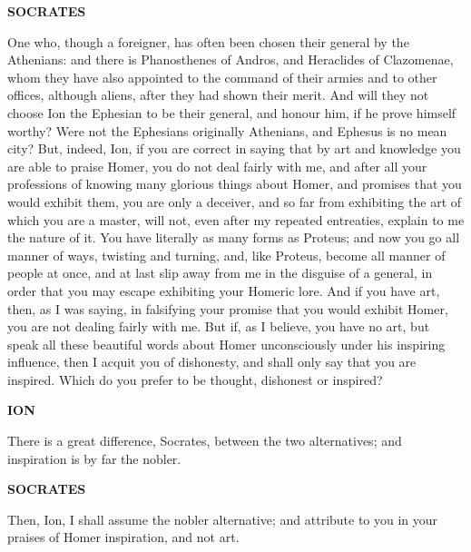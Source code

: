 \documentclass[11pt,letter]{article}
\begin{document}
\par \textbf{SOCRATES}
\par   One who, though a foreigner, has often been chosen their general by the Athenians:  and there is Phanosthenes of Andros, and Heraclides of Clazomenae, whom they have also appointed to the command of their armies and to other offices, although aliens, after they had shown their merit. And will they not choose Ion the Ephesian to be their general, and honour him, if he prove himself worthy? Were not the Ephesians originally Athenians, and Ephesus is no mean city? But, indeed, Ion, if you are correct in saying that by art and knowledge you are able to praise Homer, you do not deal fairly with me, and after all your professions of knowing many glorious things about Homer, and promises that you would exhibit them, you are only a deceiver, and so far from exhibiting the art of which you are a master, will not, even after my repeated entreaties, explain to me the nature of it. You have literally as many forms as Proteus; and now you go all manner of ways, twisting and turning, and, like Proteus, become all manner of people at once, and at last slip away from me in the disguise of a general, in order that you may escape exhibiting your Homeric lore. And if you have art, then, as I was saying, in falsifying your promise that you would exhibit Homer, you are not dealing fairly with me. But if, as I believe, you have no art, but speak all these beautiful words about Homer unconsciously under his inspiring influence, then I acquit you of dishonesty, and shall only say that you are inspired. Which do you prefer to be thought, dishonest or inspired?

\par \textbf{ION}
\par   There is a great difference, Socrates, between the two alternatives; and inspiration is by far the nobler.

\par \textbf{SOCRATES}
\par   Then, Ion, I shall assume the nobler alternative; and attribute to you in your praises of Homer inspiration, and not art.

\par 
 
\end{document}
